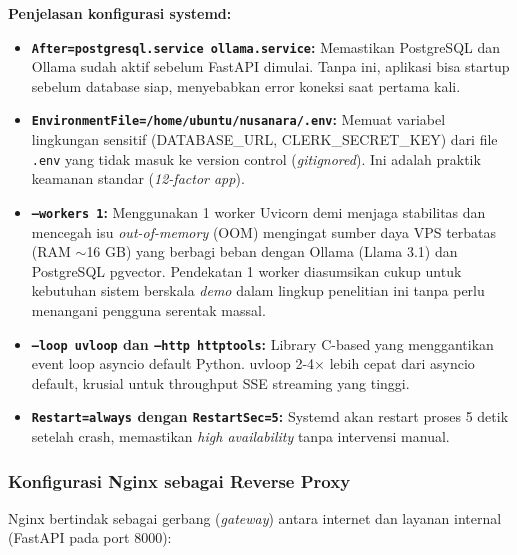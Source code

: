 \noindent \textbf{Penjelasan konfigurasi systemd:}
\begin{itemize}
  \item \textbf{\texttt{After=postgresql.service ollama.service}:} Memastikan
    PostgreSQL dan Ollama sudah aktif sebelum FastAPI dimulai. Tanpa ini, aplikasi
    bisa startup sebelum database siap, menyebabkan error koneksi saat pertama kali.
  \item \textbf{\texttt{EnvironmentFile=/home/ubuntu/nusanara/.env}:} Memuat
    variabel lingkungan sensitif (DATABASE\_URL, CLERK\_SECRET\_KEY) dari file
    \texttt{.env} yang tidak masuk ke version control (\textit{gitignored}).
    Ini adalah praktik keamanan standar (\textit{12-factor app}).
  \item \textbf{\texttt{--workers 1}:} Menggunakan 1 worker Uvicorn demi 
    menjaga stabilitas dan mencegah isu \textit{out-of-memory} (OOM) mengingat
    sumber daya VPS terbatas (RAM $\sim$16 GB) yang berbagi beban dengan Ollama
    (Llama 3.1) dan PostgreSQL pgvector. Pendekatan 1 worker diasumsikan cukup untuk
    kebutuhan sistem berskala \textit{demo} dalam lingkup penelitian ini tanpa perlu
    menangani pengguna serentak massal.
  \item \textbf{\texttt{--loop uvloop} dan \texttt{--http httptools}:}
    Library C-based yang menggantikan event loop asyncio default Python.
    uvloop 2-4$\times$ lebih cepat dari asyncio default, krusial untuk
    throughput SSE streaming yang tinggi.
  \item \textbf{\texttt{Restart=always} dengan \texttt{RestartSec=5}:}
    Systemd akan restart proses 5 detik setelah crash, memastikan
    \textit{high availability} tanpa intervensi manual.
\end{itemize}

\subsubsection{Konfigurasi Nginx sebagai Reverse Proxy}

Nginx bertindak sebagai gerbang (\textit{gateway}) antara internet dan
layanan internal (FastAPI pada port 8000):

